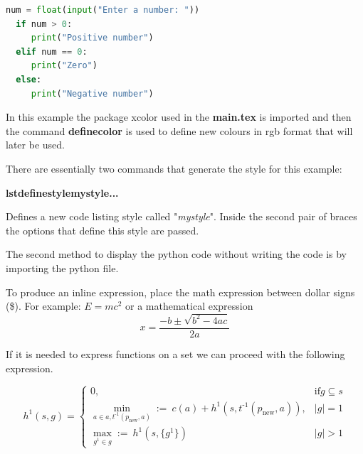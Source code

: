 \begin{lstlisting}[language=Python, caption= Python Example Code]
  num = float(input("Enter a number: "))
  if num > 0:
     print("Positive number")
  elif num == 0:
     print("Zero")
  else:
     print("Negative number")
\end{lstlisting}

In this example the package xcolor used in the \textbf{main.tex} is imported
and then the command \textbf{definecolor{}{}{}} is used to define new colours
in rgb format that will later be used. 

There are essentially two commands that generate the style for this example:

\textbf{lstdefinestyle{mystyle}{...}}

Defines a new code listing style called "\textit{mystyle}".
Inside the second pair of braces the options that define this style are passed.

The second method to display the python code without writing the code is by
importing the python file. 



To produce an inline expression, place the math expression between dollar signs
(\$).
For example: $E=mc^2$ or a mathematical expression
\[x=\frac{-b\pm\sqrt{b^2-4ac}}{2a}\]

If it is needed to express functions on a set we can proceed with the following
expression.

\begin{equation*} 
  h^1(s,g) = \begin{cases} 

    0, &  \text{if} g \subseteq s \\ 
    \min_{a \in a,t^\text{-1}(p_\text{new},a)} :=~ c(a) + h^1(s,t^\text{-1}(p_\text{new},a)), & |g| = 1 \\
    \max_{g^1 \in g} :=~ h^1 (s,\{g^1\}) & |g| > 1

  \end{cases} 
\end{equation*}
